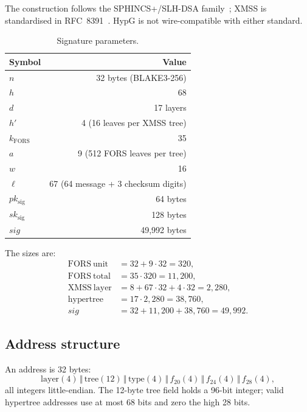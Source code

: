 \documentclass[runningheads]{llncs}
\newcommand{\concat}{\,\Vert\,}
\begin{document}
The construction follows the SPHINCS+/SLH-DSA family~\cite{sphincs,fips205};
XMSS is standardised in RFC~8391~\cite{rfc8391}.  HypG is not
wire-compatible with either standard.

\begin{table}[t]
\centering
\small
\begin{tabular}{@{}lr@{}}
\toprule
Symbol & Value \\
\midrule
$n$ & 32 bytes (BLAKE3-256) \\
$h$ & 68 \\
$d$ & 17 layers \\
$h'$ & 4 (16 leaves per XMSS tree) \\
$k_{\mathrm{FORS}}$ & 35 \\
$a$ & 9 (512 FORS leaves per tree) \\
$w$ & 16 \\
$\ell$ & 67 (64 message + 3 checksum digits) \\
$pk_{\mathrm{sig}}$ & 64 bytes \\
$sk_{\mathrm{sig}}$ & 128 bytes \\
$\mathit{sig}$ & 49,992 bytes \\
\bottomrule
\end{tabular}
\caption{Signature parameters.}
\label{tab:dsparams}
\end{table}

The sizes are:
\[
\begin{aligned}
 \mathrm{FORS\ unit} &= 32+9\cdot32=320,\\
 \mathrm{FORS\ total} &= 35\cdot320=11{,}200,\\
 \mathrm{XMSS\ layer} &= 8+67\cdot32+4\cdot32=2{,}280,\\
 \mathrm{hypertree} &= 17\cdot2{,}280=38{,}760,\\
 \mathit{sig} &= 32+11{,}200+38{,}760=49{,}992.
\end{aligned}
\]

\subsection{Address structure}

\begin{definition}[ADRS]
An address is 32 bytes:
\[
 \mathrm{layer}(4)\concat\mathrm{tree}(12)\concat
 \mathrm{type}(4)\concat f_{20}(4)\concat f_{24}(4)\concat f_{28}(4),
\]
all integers little-endian.  The 12-byte tree field holds a 96-bit
integer; valid hypertree addresses use at most 68 bits and zero the high
28 bits.
\end{definition}
\end{document}
